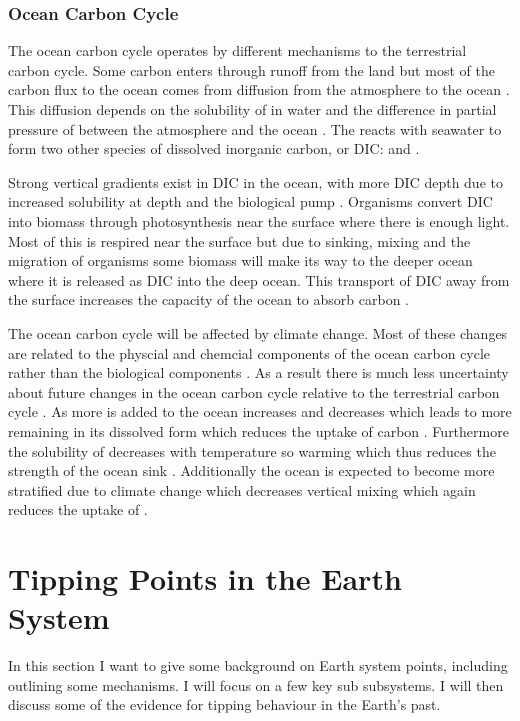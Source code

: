 \subsubsection{Ocean Carbon Cycle}

The ocean carbon cycle operates by different mechanisms to the terrestrial carbon cycle. Some carbon enters through runoff from the land but most of the carbon flux to the ocean comes
from diffusion from the atmosphere to the ocean \parencite{Devries2022}. This diffusion depends on the solubility of  in water and
the difference in partial pressure of  between the atmosphere and the ocean \parencite{Wanninkhof1992}.
The  reacts with seawater to form two other species of dissolved inorganic carbon, or DIC:\@ {} and  \parencite{Dickson1987}.

Strong vertical gradients exist in DIC in the ocean, with more DIC depth due to increased solubility at depth and the biological pump \parencite{Volk1985}. Organisms convert DIC into biomass
through photosynthesis near the surface where there is enough light. Most of this is respired near the surface but due to sinking, mixing and the migration of organisms some biomass
will make its way to the deeper ocean where it is released as DIC into the deep ocean. This transport of DIC away from the surface increases the capacity of the ocean to absorb carbon
\parencite{Sarmiento1984}.


The ocean carbon cycle will be affected by climate change. Most of these changes are related to the physcial and
chemcial components of the ocean carbon cycle rather than the biological components \parencite{AR6}. As a result there is much less uncertainty about future changes in the
ocean carbon cycle relative to the terrestrial carbon cycle \parencite{Arora2020}. As more  is added to the ocean  increases and  decreases which leads to
more  remaining in its dissolved form which reduces the uptake of carbon \parencite{Egleston2010}. Furthermore the solubility of  decreases with
temperature so warming which thus reduces the strength of the ocean sink \parencite{Weiss1974}. Additionally the ocean is expected to become more
stratified due to climate change which decreases vertical mixing which again reduces the uptake of  \parencite{DeVries2017}. 


\section{Tipping Points in the Earth System}
In this section I want to give some background on Earth system points, including outlining some mechanisms.
I will focus on a few key sub subsystems. I will then discuss some of the evidence for tipping behaviour in the Earth's past.

